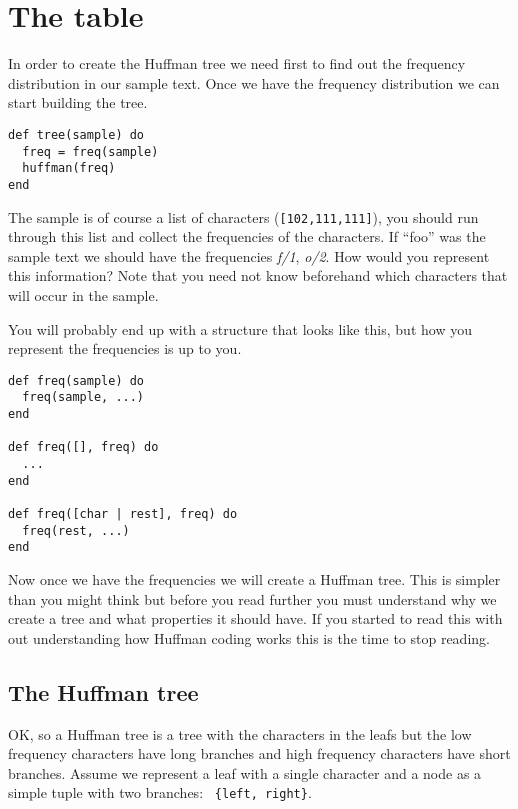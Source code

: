 \documentclass[a4paper,11pt]{article}
\begin{document}

\section{The table}

In order to create the Huffman tree we need first to find out the frequency
distribution in our sample text. Once we have the frequency
distribution we can start building the tree.

\begin{verbatim}
def tree(sample) do
  freq = freq(sample)
  huffman(freq)
end
\end{verbatim}

The sample is of course a list of characters ({\tt [102,111,111]}), you should run through
this list and collect the frequencies of the characters. If ``foo''
was the sample text we should have the frequencies {\em f/1}, {\em
  o/2}. How would you represent this information? Note that you need
not know beforehand which characters that will occur in the sample.

You will probably end up with a structure that looks like this, but
how you represent the frequencies is up to you.

\begin{verbatim}
def freq(sample) do
  freq(sample, ...)
end

def freq([], freq) do
  ...
end

def freq([char | rest], freq) do
  freq(rest, ...)
end
\end{verbatim}

Now once we have the frequencies we will create a Huffman tree. This
is simpler than you might think but before you read further you must
understand why we create a tree and what properties it should have. If
you started to read this with out understanding how Huffman coding
works this is the time to stop reading.


\subsection{The Huffman tree}
OK, so a Huffman tree is a tree with the characters in the leafs but
the low frequency characters have long branches and high frequency
characters have short branches. Assume we represent a leaf with a
single character and a node as a simple tuple with two branches: {\tt
  \{left, right\}}. 
\end{document}
